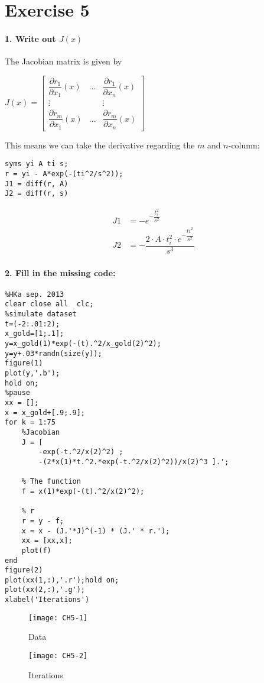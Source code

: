 \documentclass[Main]{subfiles}
\begin{document}
\section*{Exercise 5}

\paragraph{1. Write out $J(x)$} 
The Jacobian matrix is given by 


$J(x) = \begin{bmatrix}
\dfrac{\partial r_1}{\partial x_1} (x) & \ldots & \dfrac{\partial r_1}{\partial x_n} (x) \\
\vdots & & \vdots \\
\dfrac{\partial r_m}{\partial x_1} (x) & \ldots & \dfrac{\partial r_m}{\partial x_n} (x)
\end{bmatrix}$

This means we can take the derivative regarding the $m$ and $n$-column:

\begin{lstlisting}[caption=J(x), style=Code-Matlab, label=lst:CH5-1]
syms yi A ti s;
r = yi - A*exp(-(ti^2/s^2));
J1 = diff(r, A)
J2 = diff(r, s)
\end{lstlisting}

\begin{align*}
J1 &= -e^{-\dfrac{t_i^2}{s^2}} \\
J2 &= - \dfrac{2 \cdot A \cdot t_i^2 \cdot e^{-\dfrac{ti^2}{s^2}}}{s^3}
\end{align*}



\paragraph{2. Fill in the missing code:}

\begin{lstlisting}[caption=MatLab code, style=Code-Matlab, label=lst:CH5-2]
%Newton Gauss data fitting
%HKa sep. 2013
clear close all  clc;
%simulate dataset
t=(-2:.01:2);
x_gold=[1;.1];
y=x_gold(1)*exp(-(t).^2/x_gold(2)^2);
y=y+.03*randn(size(y));
figure(1)
plot(y,'.b'); 
hold on;
%pause
xx = [];
x = x_gold+[.9;.9];
for k = 1:75
    %Jacobian
    J = [ 
        -exp(-t.^2/x(2)^2) ; 
        -(2*x(1)*t.^2.*exp(-t.^2/x(2)^2))/x(2)^3 ].';
    
    % The function
    f = x(1)*exp(-(t).^2/x(2)^2);
    
    % r
    r = y - f;
    x = x - (J.'*J)^(-1) * (J.' * r.');
    xx = [xx,x];
    plot(f)  
end
figure(2)
plot(xx(1,:),'.r');hold on;
plot(xx(2,:),'.g');
xlabel('Iterations')
\end{lstlisting}


\begin{figure}[hbtp]
\centering
\texttt{[image: CH5-1]}
\vspace{-15pt}
\caption{Data}
\label{fig:CH5-1}
\end{figure}

\begin{figure}[hbtp]
\centering
\texttt{[image: CH5-2]}
\vspace{-15pt}
\caption{Iterations}
\label{fig:CH5-2}
\end{figure}
\end{document}
